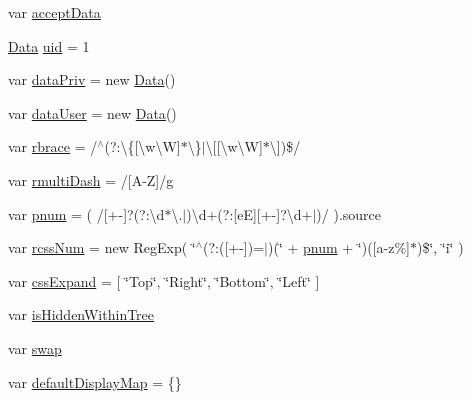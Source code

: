\begin{DoxyCompactItemize}
\item 
var \hyperlink{jquery-3_82_81_8js_ad857b8908b77daaf4e86a8c0fbce6edc}{accept\+Data}
\item 
\hyperlink{jquery-3_82_81_8js_a9b2dd8f6220c9c58ba6fe507c361743f}{Data} \hyperlink{jquery-3_82_81_8js_aef522caf72a8c16ac973e100f27bfdf8}{uid} = 1
\item 
var \hyperlink{jquery-3_82_81_8js_a00da6d485af059d4b5a333c8fe4db777}{data\+Priv} = new \hyperlink{jquery-3_82_81_8js_a9b2dd8f6220c9c58ba6fe507c361743f}{Data}()
\item 
var \hyperlink{jquery-3_82_81_8js_ad6f1d342df1a1213e1eccf55bce2d6fe}{data\+User} = new \hyperlink{jquery-3_82_81_8js_a9b2dd8f6220c9c58ba6fe507c361743f}{Data}()
\item 
var \hyperlink{jquery-3_82_81_8js_a437cfa518919d16904131d58a35205d9}{rbrace} = /$^\wedge$(?\+:\textbackslash{}\{\mbox{[}\textbackslash{}w\textbackslash{}W\mbox{]}$\ast$\textbackslash{}\}$\vert$\textbackslash{}\mbox{[}\mbox{[}\textbackslash{}w\textbackslash{}W\mbox{]}$\ast$\textbackslash{}\mbox{]})\$/
\item 
var \hyperlink{jquery-3_82_81_8js_a1c44dfebf6b25f81f9d38c1c38e46d0a}{rmulti\+Dash} = /\mbox{[}A-\/Z\mbox{]}/g
\item 
var \hyperlink{jquery-3_82_81_8js_af607b3f0791bfa36dce62ff44ab21612}{pnum} = ( /\mbox{[}+-\/\mbox{]}?(?\+:\textbackslash{}d$\ast$\textbackslash{}.$\vert$)\textbackslash{}d+(?\+:\mbox{[}eE\mbox{]}\mbox{[}+-\/\mbox{]}?\textbackslash{}d+$\vert$)/ ).source
\item 
var \hyperlink{jquery-3_82_81_8js_ac05a2956fc6b753a2395772e95f49028}{rcss\+Num} = new Reg\+Exp( \char`\"{}$^\wedge$(?\+:(\mbox{[}+-\/\mbox{]})=$\vert$)(\char`\"{} + \hyperlink{jquery-3_82_81_8js_af607b3f0791bfa36dce62ff44ab21612}{pnum} + \char`\"{})(\mbox{[}a-\/z\%\mbox{]}$\ast$)\$\char`\"{}, \char`\"{}i\char`\"{} )
\item 
var \hyperlink{jquery-3_82_81_8js_ad1957da629ea5bd26d692d17f4cf72a1}{css\+Expand} = \mbox{[} \char`\"{}Top\char`\"{}, \char`\"{}Right\char`\"{}, \char`\"{}Bottom\char`\"{}, \char`\"{}Left\char`\"{} \mbox{]}
\item 
var \hyperlink{jquery-3_82_81_8js_af3806910c58966c00b0b1e2fd2ae2fd5}{is\+Hidden\+Within\+Tree}
\item 
var \hyperlink{jquery-3_82_81_8js_a1d3525b85ad04398fea4a9eed16e2783}{swap}
\item 
var \hyperlink{jquery-3_82_81_8js_ace9af54e6091935b58be4f2cb953c12e}{default\+Display\+Map} = \{\}
\item 

\end{DoxyCompactItemize}
